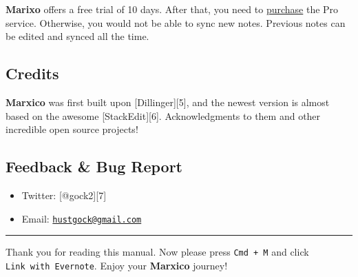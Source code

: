\textbf{Marixo} offers a free trial of 10 days. After that, you need to
\href{http://marxi.co/purchase.html}{purchase} the Pro service.
Otherwise, you would not be able to sync new notes. Previous notes can
be edited and synced all the time.

\subsection{Credits}\label{credits}

\textbf{Marxico} was first built upon {[}Dillinger{]}{[}5{]}, and the
newest version is almost based on the awesome {[}StackEdit{]}{[}6{]}.
Acknowledgments to them and other incredible open source projects!

\subsection{Feedback \& Bug Report}\label{feedback-bug-report}

\begin{itemize}
\tightlist
\item
  Twitter: {[}@gock2{]}{[}7{]}
\item
  Email:
  \href{mailto:hustgock@gmail.com}{\nolinkurl{hustgock@gmail.com}}
\end{itemize}

\begin{center}\rule{0.5\linewidth}{\linethickness}\end{center}

Thank you for reading this manual. Now please press \texttt{Cmd\ +\ M}
and click \texttt{Link\ with\ Evernote}. Enjoy your \textbf{Marxico}
journey!
